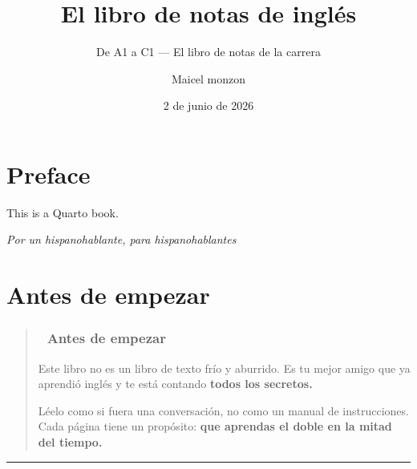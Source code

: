 \documentclass[
  spanish,
  letterpaper,
]{scrbook}
\title{El libro de notas de inglés}
\subtitle{De A1 a C1 --- El libro de notas de la carrera}
\author{Maicel monzon}
\date{2 de junio de 2026}
\renewcommand*\contentsname{Tabla de contenidos}
\newcommand\contentsname{Tabla de contenidos}
\begin{document}
\frontmatter
\maketitle

\renewcommand*\contentsname{Tabla de contenidos}
{
\hypersetup{linkcolor=}
\setcounter{tocdepth}{2}
\tableofcontents
}

\mainmatter
{}

\chapter*{Preface}\label{preface}


This is a Quarto book.

\emph{Por un hispanohablante, para hispanohablantes}


\chapter{Antes de empezar}\label{antes-de-empezar}

\begin{quote}
\subsection{💬 Antes de empezar}\label{antes-de-empezar-1}

Este libro no es un libro de texto frío y aburrido. Es tu mejor amigo
que ya aprendió inglés y te está contando \textbf{todos los secretos.}

Léelo como si fuera una conversación, no como un manual de
instrucciones. Cada página tiene un propósito: \textbf{que aprendas el
doble en la mitad del tiempo.}
\end{quote}

\begin{center}\rule{0.5\linewidth}{0.5pt}\end{center}
\end{document}

